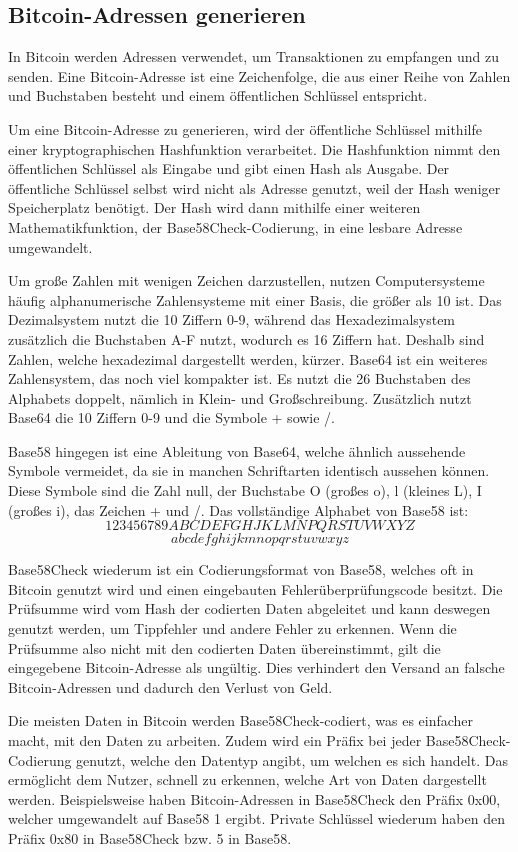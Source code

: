 \subsection{Bitcoin-Adressen generieren}
In Bitcoin werden Adressen verwendet, um Transaktionen zu empfangen und zu senden. Eine Bitcoin-Adresse ist eine Zeichenfolge, 
die aus einer Reihe von Zahlen und Buchstaben besteht und einem öffentlichen Schlüssel entspricht.

Um eine Bitcoin-Adresse zu generieren, wird der öffentliche Schlüssel mithilfe einer kryptographischen Hashfunktion verarbeitet.
Die Hashfunktion nimmt den öffentlichen Schlüssel als Eingabe und gibt einen Hash als Ausgabe. Der öffentliche Schlüssel selbst
wird nicht als Adresse genutzt, weil der Hash weniger Speicherplatz benötigt. Der Hash wird dann mithilfe einer weiteren 
Mathematikfunktion, der Base58Check-Codierung, in eine lesbare Adresse umgewandelt.

Um große Zahlen mit wenigen Zeichen darzustellen, nutzen Computersysteme häufig alphanumerische Zahlensysteme mit einer Basis,
die größer als 10 ist. Das Dezimalsystem nutzt die 10 Ziffern 0-9, während das Hexadezimalsystem zusätzlich die Buchstaben A-F
nutzt, wodurch es 16 Ziffern hat. Deshalb sind Zahlen, welche hexadezimal dargestellt werden, kürzer. Base64 ist ein weiteres
Zahlensystem, das noch viel kompakter ist. Es nutzt die 26 Buchstaben des Alphabets doppelt, nämlich in Klein- und Großschreibung.
Zusätzlich nutzt Base64 die 10 Ziffern 0-9 und die Symbole + sowie /.

Base58 hingegen ist eine Ableitung von Base64, welche ähnlich aussehende Symbole vermeidet, da sie in manchen Schriftarten
identisch aussehen können. Diese Symbole sind die Zahl null, der Buchstabe O (großes o), l (kleines L), I (großes i), das 
Zeichen + und /. Das vollständige Alphabet von Base58 ist: 
\[123456789ABCDEFGHJKLMNPQRSTUVWXYZ\]
\[abcdefghijkmnopqrstuvwxyz\]

Base58Check wiederum ist ein Codierungsformat von Base58, welches oft in Bitcoin genutzt wird und einen eingebauten
Fehlerüberprüfungscode besitzt. Die Prüfsumme wird vom Hash der codierten Daten abgeleitet und kann deswegen genutzt werden, 
um Tippfehler und andere Fehler zu erkennen. Wenn die Prüfsumme also nicht mit den codierten Daten übereinstimmt, gilt die
eingegebene Bitcoin-Adresse als ungültig. Dies verhindert den Versand an falsche Bitcoin-Adressen und dadurch den Verlust
von Geld. 

Die meisten Daten in Bitcoin werden Base58Check-codiert, was es einfacher macht, mit den Daten zu arbeiten. Zudem wird ein Präfix
bei jeder Base58Check-Codierung genutzt, welche den Datentyp angibt, um welchen es sich handelt. Das ermöglicht dem Nutzer, schnell
zu erkennen, welche Art von Daten dargestellt werden. Beispielsweise haben Bitcoin-Adressen in Base58Check den Präfix 0x00, welcher
umgewandelt auf Base58 1 ergibt. Private Schlüssel wiederum haben den Präfix 0x80 in Base58Check bzw. 5 in Base58.

